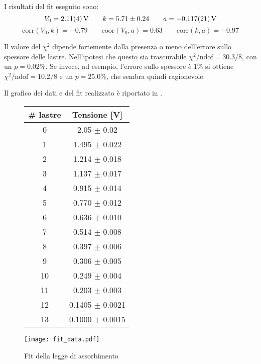 I risultati del fit eseguito sono:
$$V_0 = \SI{2.11 \pm 0.04}{\volt} \qquad k = 5.71 \pm 0.24 \qquad a = \SI{-0.117 \pm 0.021}{\volt}$$
$$ \text{corr}(V_0,k) = -0.79 \qquad \text{coor}(V_0,a) = 0.63 \qquad \text{corr}(k,a) = -0.97$$

Il valore del $\chi^2$ dipende fortemente dalla presenza o meno dell'errore sullo spessore delle lastre. Nell'ipotesi che questo sia trascurabile $\chi^2 /\text{ndof} = 30.3 / 8$, con un $p = 0.02\%$. Se invece, ad esempio, l'errore sullo spessore è $1\%$ si ottiene $\chi^2 /\text{ndof} = 10.2 / 8$ e un $p = 25.0\%$, che sembra quindi ragionevole.

Il grafico dei dati e del fit realizzato è riportato in .

\begin{figure}[H]
		\begin{minipage}{0.28\textwidth}
			\begin{tabular}{cc}
				\toprule
				\# lastre & Tensione [V]\\
				\midrule
				0  & 2.05 $\pm$ 0.02\\
				1  & 1.495 $\pm$ 0.022\\
				2  & 1.214 $\pm$ 0.018\\
				3  & 1.137 $\pm$ 0.017\\
				4  & 0.915 $\pm$ 0.014\\
				5  & 0.770 $\pm$ 0.012\\
				6  & 0.636 $\pm$ 0.010\\
				7  & 0.514 $\pm$ 0.008\\
				8  & 0.397 $\pm$ 0.006\\
				9  & 0.306 $\pm$ 0.005\\
				10 & 0.249 $\pm$ 0.004\\
				11 & 0.203 $\pm$ 0.003\\
				12 & 0.1405 $\pm$ 0.0021\\
				13 & 0.1000 $\pm$ 0.0015\\
				\bottomrule
			\end{tabular}
			\label{tab:data}
		\end{minipage}
	\begin{minipage}{0.75\textwidth}
		\centering
		\texttt{[image: fit\_data.pdf]}
		\caption{Fit della legge di assorbimento}
		\label{fig:fit}
	\end{minipage}
\end{figure}
